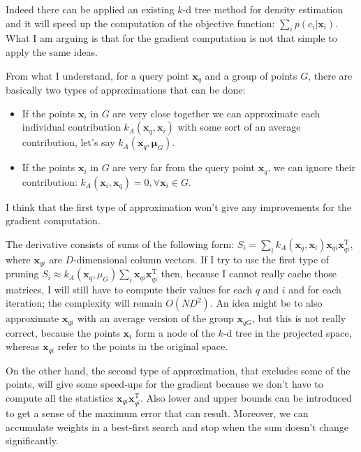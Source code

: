 \documentclass[12pt]{article}
\title{}
\author{}
\begin{document}
Indeed there can be applied an existing $k$-d tree method for density estimation and it will speed up the computation of the objective function: $\sum_i{p(c_i|\mathbf{x}_i)}$. What I am arguing is that for the gradient computation is not that simple to apply the same ideas.

From what I understand, for a query point $\mathbf{x}_q$ and a group of points $G$, there are basically two types of approximations that can be done:
\begin{itemize}
  \item If the points $\mathbf{x}_i$ in $G$ are very close together we can approximate each individual contribution $k_A(\mathbf{x}_q, \mathbf{x}_i)$ with some sort of an average contribution, let's say $k_A(\mathbf{x}_q, \mathbf{\mu}_G)$.
  \item If the points $\mathbf{x}_i$ in $G$ are very far from the query point $\mathbf{x}_q$, we can ignore their contribution: $k_A(\mathbf{x}_i,\mathbf{x}_q) = 0, \forall \mathbf{x}_i \in G$.
\end{itemize}

I think that the first type of approximation won't give any improvements for the gradient computation.

The derivative consists of sums of the following form: $S_i = \sum_i k_A(\mathbf{x}_q,\mathbf{x}_i) \mathbf{x}_{qi} \mathbf{x}_{qi}^\mathrm{T}$, where $\mathbf{x}_{qi}$ are $D$-dimensional column vectors. If I try to use the first type of pruning $S_i \approx k_A(\mathbf{x}_q, \mu_G) \sum_i \mathbf{x}_{qi} \mathbf{x}_{qi}^\mathrm{T}$ then, because I cannot really cache those matrices, I will still have to compute their values for each $q$ and $i$ and for each iteration; the complexity will remain $O(ND^2)$. An idea might be to also approximate $\mathbf{x}_{qi}$ with an average version of the group $\mathbf{x}_{qG}$, but this is not really correct, because the points $\mathbf{x}_i$ form a node of the $k$-d tree in the projected space, whereas $\mathbf{x}_{qi}$ refer to the points in the original space.

On the other hand, the second type of approximation, that excludes some of the points, will give some speed-ups for the gradient because we don't have to compute all the statistics $\mathbf{x}_{qi} \mathbf{x}_{qi}^\mathrm{T}$. Also lower and upper bounds can be introduced to get a sense of the maximum error that can result. Moreover, we can accumulate weights in a best-first search and stop when the sum doesn't change significantly.
\end{document}
